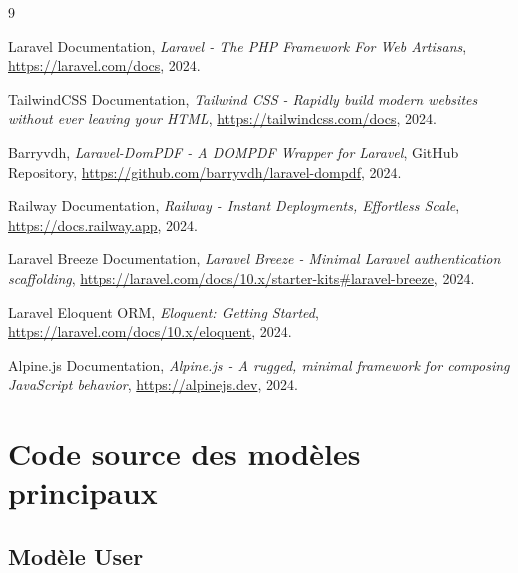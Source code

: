 \documentclass[a4paper,12pt,twoside]{report}
\begin{document}
\newpage
{}

\begin{thebibliography}{9}

Laravel Documentation,
\textit{Laravel - The PHP Framework For Web Artisans},
\url{https://laravel.com/docs}, 2024.

TailwindCSS Documentation,
\textit{Tailwind CSS - Rapidly build modern websites without ever leaving your HTML},
\url{https://tailwindcss.com/docs}, 2024.

Barryvdh,
\textit{Laravel-DomPDF - A DOMPDF Wrapper for Laravel},
GitHub Repository,
\url{https://github.com/barryvdh/laravel-dompdf}, 2024.

Railway Documentation,
\textit{Railway - Instant Deployments, Effortless Scale},
\url{https://docs.railway.app}, 2024.

Laravel Breeze Documentation,
\textit{Laravel Breeze - Minimal Laravel authentication scaffolding},
\url{https://laravel.com/docs/10.x/starter-kits#laravel-breeze}, 2024.

Laravel Eloquent ORM,
\textit{Eloquent: Getting Started},
\url{https://laravel.com/docs/10.x/eloquent}, 2024.

Alpine.js Documentation,
\textit{Alpine.js - A rugged, minimal framework for composing JavaScript behavior},
\url{https://alpinejs.dev}, 2024.

\end{thebibliography}

\appendix
\appendixpage
\addappheadtotoc

\chapter{Code source des modèles principaux}

\section{Modèle User}
\end{document}
